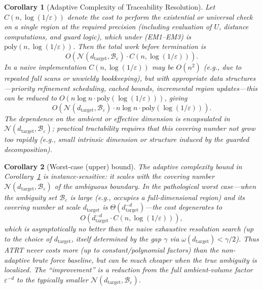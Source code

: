 \documentclass[12pt]{article}
\theoremstyle{definition}
\theoremstyle{plain}
\newtheorem{corollary}{Corollary}[section]
\begin{document}
\begin{corollary}[Adaptive Complexity of Traceability Resolution]
\label{cor:ATRT-complexity}
Let \(C(n,\log(1/\varepsilon))\) denote the cost to perform the existential or universal check on a single region at the required precision (including evaluation of \(U\), distance computations, and guard logic), which under (EM1–EM3) is \(\mathrm{poly}(n,\log(1/\varepsilon))\). Then the total work before termination is
\[
O\!\left(
  \mathcal N(d_{\mathrm{target}},\mathcal B_{\varepsilon})
  \cdot C(n,\log(1/\varepsilon))
\right).
\]
In a naive implementation \(C(n,\log(1/\varepsilon))\) may be \(O(n^2)\) (e.g., due to repeated full scans or unwieldy bookkeeping), but with appropriate data structures—priority refinement scheduling, cached bounds, incremental region updates—this can be reduced to \(O(n\log n\cdot \mathrm{poly}(\log(1/\varepsilon)))\), giving
\[
O\!\left(
  \mathcal N(d_{\mathrm{target}},\mathcal B_{\varepsilon})
  \cdot n\log n \cdot \mathrm{poly}(\log(1/\varepsilon))
\right).
\]
The dependence on the ambient or effective dimension is encapsulated in \(\mathcal N(d_{\mathrm{target}},\mathcal B_{\varepsilon})\); practical tractability requires that this covering number not grow too rapidly (e.g., small intrinsic dimension or structure induced by the guarded decomposition).
\end{corollary}

\begin{corollary}[Worst-case (upper) bound]
The adaptive complexity bound in Corollary~\ref{cor:ATRT-complexity} is \emph{instance-sensitive}: it scales with the covering number \(\mathcal N(d_{\mathrm{target}},\mathcal B_{\varepsilon})\) of the ambiguous boundary. In the pathological worst case—when the ambiguity set \(\mathcal B_{\varepsilon}\) is large (e.g., occupies a full-dimensional region) and its covering number at scale \(d_{\mathrm{target}}\) is \(\Theta(d_{\mathrm{target}}^{-d})\)—the cost degenerates to
\[
O\!\left(
  d_{\mathrm{target}}^{-d}\cdot C(n,\log(1/\varepsilon))
\right),
\]
which is asymptotically no better than the naive exhaustive resolution search (up to the choice of \(d_{\mathrm{target}}\), itself determined by the gap \(\gamma\) via \(\omega(d_{\mathrm{target}})<\gamma/2\)). Thus ATRT never costs more (up to constant/polynomial factors) than the non-adaptive brute force baseline, but can be much cheaper when the true ambiguity is localized. The “improvement” is a reduction from the full ambient-volume factor \(\varepsilon^{-d}\) to the typically smaller \(\mathcal N(d_{\mathrm{target}},\mathcal B_{\varepsilon})\).
\end{corollary}
\end{document}
